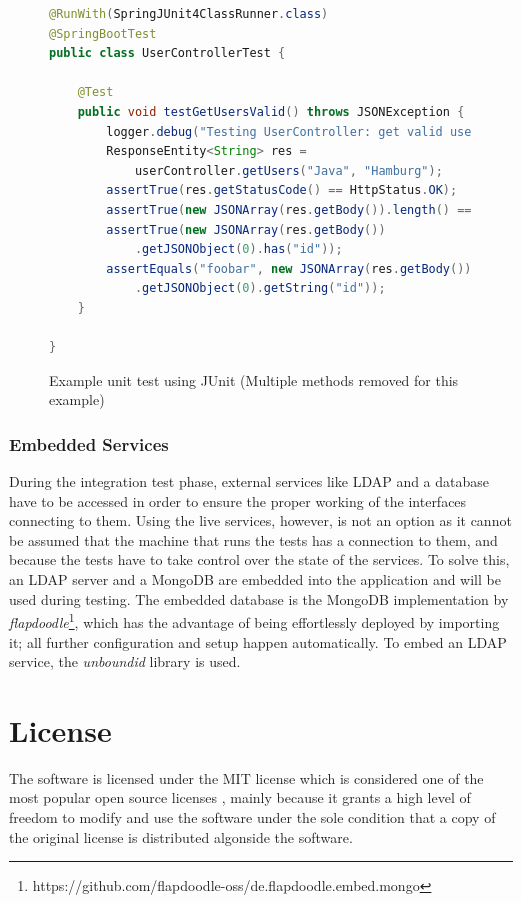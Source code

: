 \begin{figure}[h]
\begin{lstlisting}[language=Java]
@RunWith(SpringJUnit4ClassRunner.class)
@SpringBootTest
public class UserControllerTest {

	@Test
	public void testGetUsersValid() throws JSONException {
		logger.debug("Testing UserController: get valid users");
		ResponseEntity<String> res =
			userController.getUsers("Java", "Hamburg");
		assertTrue(res.getStatusCode() == HttpStatus.OK);
		assertTrue(new JSONArray(res.getBody()).length() == 1);
		assertTrue(new JSONArray(res.getBody())
			.getJSONObject(0).has("id"));
		assertEquals("foobar", new JSONArray(res.getBody())
			.getJSONObject(0).getString("id"));
	}

}
\end{lstlisting}
\caption[Code: Example Unit Test]{Example unit test using JUnit (Multiple methods removed for this example)}
\end{figure}


\subsubsection{Embedded Services}
During the integration test phase, external services like LDAP and a database have to be accessed in order to ensure the proper working of the interfaces connecting to them. Using the live services, however, is not an option as it cannot be assumed that the machine that runs the tests has a connection to them, and because the tests have to take control over the state of the services. To solve this, an LDAP server and a MongoDB are embedded into the application and will be used during testing.
The embedded database is the MongoDB implementation by \textit{flapdoodle}\footnote{https://github.com/flapdoodle-oss/de.flapdoodle.embed.mongo}, which has the advantage of being effortlessly deployed by importing it; all further configuration and setup happen automatically.
To embed an LDAP service, the \textit{unboundid} library is used.

\section{License}
The software is licensed under the MIT license \cite{license} which is considered one of the most popular open source licenses \cite{mit_stats}, mainly because it grants a high level of freedom to modify and use the software under the sole condition that a copy of the original license is distributed algonside the software.

